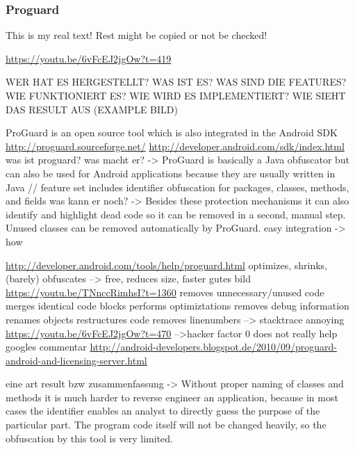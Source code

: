 \subsubsection{Proguard} \label{subsubsection:counter-reengineering-optobf-proguard}
This is my real text! Rest might be copied or not be checked!

\url{https://youtu.be/6vFcEJ2jgOw?t=419}\newline

WER HAT ES HERGESTELLT? WAS IST ES? WAS SIND DIE FEATURES? WIE FUNKTIONIERT ES? WIE WIRD ES IMPLEMENTIERT? WIE SIEHT DAS RESULT AUS (EXAMPLE BILD)\newline

ProGuard is an open source tool which is also integrated in the Android SDK
\url{http://proguard.sourceforge.net/}
\url{http://developer.android.com/sdk/index.html}\newline
was ist proguard? was macht er? -> ProGuard is basically a Java obfuscator but can also be used for Android applications because they are usually written in Java // feature set includes identifier obfuscation for packages, classes, methods, and fields\newline
was kann er noch? -> Besides these protection mechanisms it can also identify and highlight dead code so it can be removed in a second, manual step. Unused classes can be removed automatically by ProGuard.\newline
easy integration -> how\newline

\url{http://developer.android.com/tools/help/proguard.html}\newline
optimizes, shrinks, (barely) obfuscates --> free, reduces size, faster\newline
gutes bild \url{https://youtu.be/TNnccRimhsI?t=1360}\newline
removes unnecessary/unused code\newline
merges identical code blocks\newline
performs optimiztations\newline
removes debug information\newline
renames objects\newline
restructures code\newline
removes linenumbers --> stacktrace annoying\newline
\url{https://youtu.be/6vFcEJ2jgOw?t=470}\newline
-->hacker factor 0\newline
does not really help\newline
googles commentar \url{http://android-developers.blogspot.de/2010/09/proguard-android-and-licensing-server.html}\newline

eine art result bzw zusammenfassung -> Without proper naming of classes and methods it is much harder to reverse engineer an application, because in most cases the identifier enables an analyst to directly guess the purpose of the particular part. The program code itself will not be changed heavily, so the obfuscation by this tool is very limited.
